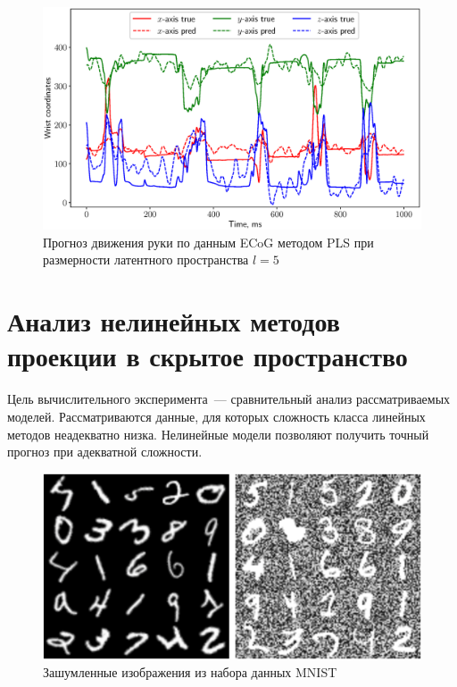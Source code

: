 \begin{figure}[ht]
	\centering
	\includegraphics[width=\textwidth]{figs/ch2/ecog_prediction}
	\caption{Прогноз движения руки по данным ECoG методом PLS при размерности латентного пространства $l=5$}
	\label{ch2:fig:ecog_prediction}
\end{figure}

\section{Анализ нелинейных методов проекции в скрытое пространство}
\label{sec:ch2:exp_nonlinear}

Цель вычислительного эксперимента~--- сравнительный анализ рассматриваемых моделей.
Рассматриваются данные, для которых сложность класса линейных методов неадекватно низка.
Нелинейные модели позволяют получить точный прогноз при адекватной сложности.

\begin{figure}[ht]
	\centering 
	\includegraphics[width=\linewidth]{figs/ch2/noisy_mnist}
	\caption{Зашумленные изображения из набора данных MNIST}
	\label{ch2:fig:noisy_mnist}
\end{figure}

